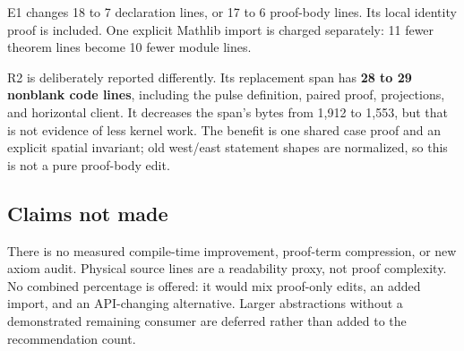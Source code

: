 E1 changes 18 to 7 declaration lines, or 17 to 6 proof-body lines. Its local identity proof is included. One explicit Mathlib import is charged separately: 11 fewer theorem lines become 10 fewer module lines.

R2 is deliberately reported differently. Its replacement span has \textbf{28 to 29 nonblank code lines}, including the pulse definition, paired proof, projections, and horizontal client. It decreases the span's bytes from 1,912 to 1,553, but that is not evidence of less kernel work. The benefit is one shared case proof and an explicit spatial invariant; old west/east statement shapes are normalized, so this is not a pure proof-body edit.

\subsection{Claims not made}

There is no measured compile-time improvement, proof-term compression, or new axiom audit. Physical source lines are a readability proxy, not proof complexity. No combined percentage is offered: it would mix proof-only edits, an added import, and an API-changing alternative. Larger abstractions without a demonstrated remaining consumer are deferred rather than added to the recommendation count.
